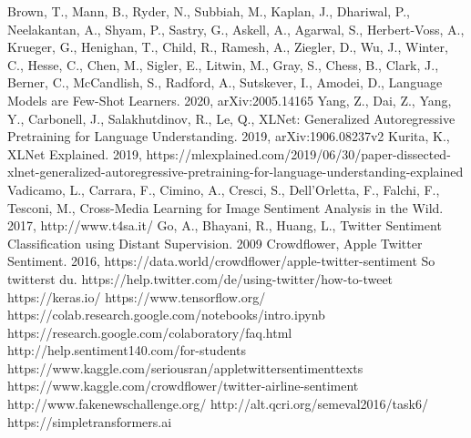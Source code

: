 \documentclass[12pt,german]{report}
\begin{document}
\begin{thebibliography}{}
 Brown, T., Mann, B., Ryder, N., Subbiah, M., Kaplan, J., Dhariwal, P., Neelakantan, A., Shyam, P., Sastry, G., Askell, A., Agarwal, S., Herbert-Voss, A., Krueger, G., Henighan, T., Child, R., Ramesh, A., Ziegler, D., Wu, J., Winter, C., Hesse, C., Chen, M., Sigler, E., Litwin, M., Gray, S., Chess, B., Clark, J., Berner, C., McCandlish, S., Radford, A., Sutskever, I., Amodei, D., Language Models are Few-Shot Learners. 2020,  arXiv:2005.14165 
 Yang, Z., Dai, Z., Yang, Y., Carbonell, J., Salakhutdinov, R., Le, Q., XLNet: Generalized Autoregressive Pretraining
for Language Understanding. 2019, arXiv:1906.08237v2
 Kurita, K., XLNet Explained. 2019,  https://mlexplained.com/2019/06/30/paper-dissected-xlnet-generalized-autoregressive-pretraining-for-language-understanding-explained
 Vadicamo, L., Carrara, F., Cimino, A., Cresci, S., Dell'Orletta, F., Falchi, F., Tesconi, M., Cross-Media Learning for Image Sentiment Analysis in the Wild. 2017, http://www.t4sa.it/
 Go, A., Bhayani, R., Huang, L., Twitter Sentiment Classification using Distant Supervision. 2009
 Crowdflower, Apple Twitter Sentiment. 2016, https://data.world/crowdflower/apple-twitter-sentiment
 So twitterst du. https://help.twitter.com/de/using-twitter/how-to-tweet
 https://keras.io/
 https://www.tensorflow.org/
 https://colab.research.google.com/notebooks/intro.ipynb
 https://research.google.com/colaboratory/faq.html
 http://help.sentiment140.com/for-students
 https://www.kaggle.com/seriousran/appletwittersentimenttexts
 https://www.kaggle.com/crowdflower/twitter-airline-sentiment
 http://www.fakenewschallenge.org/
 http://alt.qcri.org/semeval2016/task6/
 https://simpletransformers.ai

\end{thebibliography}
\end{document}
